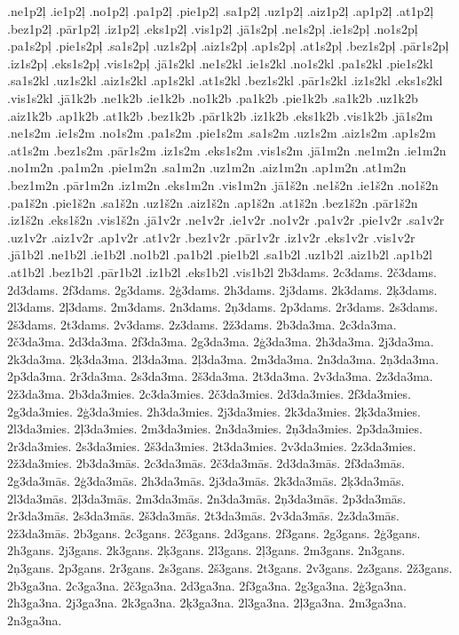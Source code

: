 {.ne1p2ļ
.ie1p2ļ
.no1p2ļ
.pa1p2ļ
.pie1p2ļ
.sa1p2ļ
.uz1p2ļ
.aiz1p2ļ
.ap1p2ļ
.at1p2ļ
.bez1p2ļ
.pār1p2ļ
.iz1p2ļ
.eks1p2ļ
.vis1p2ļ
.jā1s2pļ
.ne1s2pļ
.ie1s2pļ
.no1s2pļ
.pa1s2pļ
.pie1s2pļ
.sa1s2pļ
.uz1s2pļ
.aiz1s2pļ
.ap1s2pļ
.at1s2pļ
.bez1s2pļ
.pār1s2pļ
.iz1s2pļ
.eks1s2pļ
.vis1s2pļ
.jā1s2kl
.ne1s2kl
.ie1s2kl
.no1s2kl
.pa1s2kl
.pie1s2kl
.sa1s2kl
.uz1s2kl
.aiz1s2kl
.ap1s2kl
.at1s2kl
.bez1s2kl
.pār1s2kl
.iz1s2kl
.eks1s2kl
.vis1s2kl
.jā1k2b
.ne1k2b
.ie1k2b
.no1k2b
.pa1k2b
.pie1k2b
.sa1k2b
.uz1k2b
.aiz1k2b
.ap1k2b
.at1k2b
.bez1k2b
.pār1k2b
.iz1k2b
.eks1k2b
.vis1k2b
.jā1s2m
.ne1s2m
.ie1s2m
.no1s2m
.pa1s2m
.pie1s2m
.sa1s2m
.uz1s2m
.aiz1s2m
.ap1s2m
.at1s2m
.bez1s2m
.pār1s2m
.iz1s2m
.eks1s2m
.vis1s2m
.jā1m2n
.ne1m2n
.ie1m2n
.no1m2n
.pa1m2n
.pie1m2n
.sa1m2n
.uz1m2n
.aiz1m2n
.ap1m2n
.at1m2n
.bez1m2n
.pār1m2n
.iz1m2n
.eks1m2n
.vis1m2n
.jā1š2n
.ne1š2n
.ie1š2n
.no1š2n
.pa1š2n
.pie1š2n
.sa1š2n
.uz1š2n
.aiz1š2n
.ap1š2n
.at1š2n
.bez1š2n
.pār1š2n
.iz1š2n
.eks1š2n
.vis1š2n
.jā1v2r
.ne1v2r
.ie1v2r
.no1v2r
.pa1v2r
.pie1v2r
.sa1v2r
.uz1v2r
.aiz1v2r
.ap1v2r
.at1v2r
.bez1v2r
.pār1v2r
.iz1v2r
.eks1v2r
.vis1v2r
.jā1b2l
.ne1b2l
.ie1b2l
.no1b2l
.pa1b2l
.pie1b2l
.sa1b2l
.uz1b2l
.aiz1b2l
.ap1b2l
.at1b2l
.bez1b2l
.pār1b2l
.iz1b2l
.eks1b2l
.vis1b2l
2b3dams.
2c3dams.
2č3dams.
2d3dams.
2f3dams.
2g3dams.
2ģ3dams.
2h3dams.
2j3dams.
2k3dams.
2ķ3dams.
2l3dams.
2ļ3dams.
2m3dams.
2n3dams.
2ņ3dams.
2p3dams.
2r3dams.
2s3dams.
2š3dams.
2t3dams.
2v3dams.
2z3dams.
2ž3dams.
2b3da3ma.
2c3da3ma.
2č3da3ma.
2d3da3ma.
2f3da3ma.
2g3da3ma.
2ģ3da3ma.
2h3da3ma.
2j3da3ma.
2k3da3ma.
2ķ3da3ma.
2l3da3ma.
2ļ3da3ma.
2m3da3ma.
2n3da3ma.
2ņ3da3ma.
2p3da3ma.
2r3da3ma.
2s3da3ma.
2š3da3ma.
2t3da3ma.
2v3da3ma.
2z3da3ma.
2ž3da3ma.
2b3da3mies.
2c3da3mies.
2č3da3mies.
2d3da3mies.
2f3da3mies.
2g3da3mies.
2ģ3da3mies.
2h3da3mies.
2j3da3mies.
2k3da3mies.
2ķ3da3mies.
2l3da3mies.
2ļ3da3mies.
2m3da3mies.
2n3da3mies.
2ņ3da3mies.
2p3da3mies.
2r3da3mies.
2s3da3mies.
2š3da3mies.
2t3da3mies.
2v3da3mies.
2z3da3mies.
2ž3da3mies.
2b3da3mās.
2c3da3mās.
2č3da3mās.
2d3da3mās.
2f3da3mās.
2g3da3mās.
2ģ3da3mās.
2h3da3mās.
2j3da3mās.
2k3da3mās.
2ķ3da3mās.
2l3da3mās.
2ļ3da3mās.
2m3da3mās.
2n3da3mās.
2ņ3da3mās.
2p3da3mās.
2r3da3mās.
2s3da3mās.
2š3da3mās.
2t3da3mās.
2v3da3mās.
2z3da3mās.
2ž3da3mās.
2b3gans.
2c3gans.
2č3gans.
2d3gans.
2f3gans.
2g3gans.
2ģ3gans.
2h3gans.
2j3gans.
2k3gans.
2ķ3gans.
2l3gans.
2ļ3gans.
2m3gans.
2n3gans.
2ņ3gans.
2p3gans.
2r3gans.
2s3gans.
2š3gans.
2t3gans.
2v3gans.
2z3gans.
2ž3gans.
2b3ga3na.
2c3ga3na.
2č3ga3na.
2d3ga3na.
2f3ga3na.
2g3ga3na.
2ģ3ga3na.
2h3ga3na.
2j3ga3na.
2k3ga3na.
2ķ3ga3na.
2l3ga3na.
2ļ3ga3na.
2m3ga3na.
2n3ga3na.
}
